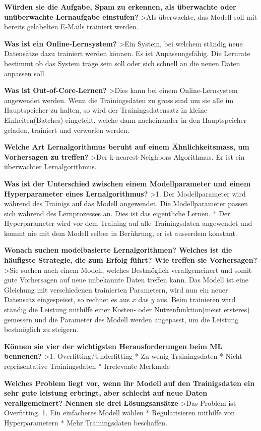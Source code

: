 \documentclass[11pt]{article}
\begin{document}
\textbf{Würden sie die Aufgabe, Spam zu erkennen, als überwachte oder
unüberwachte Lernaufgabe einstufen?} \textgreater{}Als überwachte, das
Modell soll mit bereits gelabelten E-Mails trainiert werden.

\textbf{Was ist ein Online-Lernsystem?} \textgreater{}Ein System, bei
welchem ständig neue Datensätze dazu trainiert werden können. Es ist
Anpassungsfähig. Die Lernrate bestimmt ob das System träge sein soll
oder sich schnell an die neuen Daten anpassen soll.

\textbf{Was ist Out-of-Core-Lernen?} \textgreater{}Dies kann bei einem
Online-Lernsystem angewendet werden. Wenn die Trainingsdaten zu gross
sind um sie alle im Hauptspeicher zu halten, so wird der
Trainingsdatensatz in kleine Einheiten(Batches) eingeteilt, welche dann
nacheinander in den Hauptspeicher geladen, trainiert und verworfen
werden.

\textbf{Welche Art Lernalgorithmus beruht auf einem Ähnlichkeitsmass, um
Vorhersagen zu treffen?} \textgreater{}Der k-nearest-Neighbors
Algorithmus. Er ist ein überwachter Lernalgorithmus.

\textbf{Was ist der Unterschied zwischen einem Modellparameter und einem
Hyperparameter eines Lernalgorithmus?} \textgreater{}1. Der
Modellparameter wird während des Trainigs auf das Modell angewendet. Die
Modellparameter passen sich während des Lernprozesses an. Dies ist das
eigentliche Lernen. * Der Hyperparameter wird vor dem Training auf alle
Trainingsdaten angewendet und kommt nie mit dem Modell selber in
Berührung, er ist ausserdem konstant.

\textbf{Wonach suchen modelbasierte Lernalgorithmen? Welches ist die
häufigste Strategie, die zum Erfolg führt? Wie treffen sie Vorhersagen?}
\textgreater{}Sie suchen nach einem Modell, welches Bestmöglich
verallgemeinert und somit gute Vorhersagen auf neue unbekannte Daten
treffen kann. Das Modell ist eine Gleichung mit verschiedenen
trainierten Parametern, wird nun ein neuer Datensatz eingespeisst, so
rechnet es aus \(x\) das \(y\) aus. Beim trainieren wird ständig die
Leistung mithilfe einer Kosten- oder Nutzenfunktion(meist ersteres)
gemessen und die Parameter des Modell werden angepasst, um die Leistung
bestmöglich zu steigern.

\textbf{Können sie vier der wichtigsten Herausforderungen beim ML
bennenen?} \textgreater{}1. Overfitting/Underfitting * Zu wenig
Trainingsdaten * Nicht repräsentative Trainingsdaten * Irrelevante
Merkmale

\textbf{Welches Problem liegt vor, wenn ihr Modell auf den Trainigsdaten
ein sehr gute leistung erbringt, aber schlecht auf neue Daten
verallgemeinert? Nennen sie drei Lösungsansätze} \textgreater{}Das
Problem ist Overfitting. 1. Ein einfacheres Modell wählen *
Regularisieren mithilfe von Hyperparametern * Mehr Trainingsdaten
beschaffen.
\end{document}
